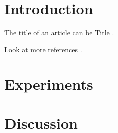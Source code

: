 \documentclass{article}
\begin{document}
\section{Introduction}
The title of an article can be Title \cite{ARTICLE:1}.

\lipsum[1-2]

Look at more references \cite{DUMMY:1}.

\lipsum[1-2]

\section{Experiments}
\lipsum[3-4]

\section{Discussion}
\lipsum[1-2]



 
\end{document}
